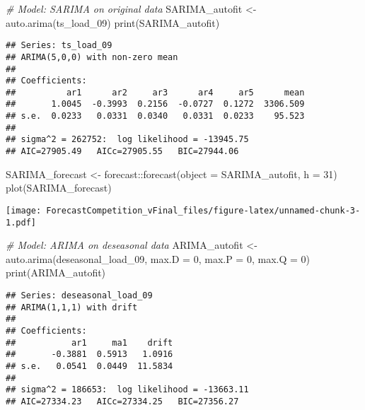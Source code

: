 \documentclass[
]{article}
\newenvironment{Shaded}{\begin{snugshade}}{\end{snugshade}}
\newcommand{\AttributeTok}[1]{\textcolor[rgb]{0.77,0.63,0.00}{#1}}
\newcommand{\CommentTok}[1]{\textcolor[rgb]{0.56,0.35,0.01}{\textit{#1}}}
\newcommand{\DecValTok}[1]{\textcolor[rgb]{0.00,0.00,0.81}{#1}}
\newcommand{\FunctionTok}[1]{\textcolor[rgb]{0.00,0.00,0.00}{#1}}
\newcommand{\NormalTok}[1]{#1}
\newcommand{\OtherTok}[1]{\textcolor[rgb]{0.56,0.35,0.01}{#1}}
\newcommand{\SpecialCharTok}[1]{\textcolor[rgb]{0.00,0.00,0.00}{#1}}
\begin{document}
\begin{Shaded}
\begin{Highlighting}[]
\CommentTok{\# Model:  SARIMA on original data}
\NormalTok{SARIMA\_autofit }\OtherTok{\textless{}{-}} \FunctionTok{auto.arima}\NormalTok{(ts\_load\_09)}
\FunctionTok{print}\NormalTok{(SARIMA\_autofit)}
\end{Highlighting}
\end{Shaded}

\begin{verbatim}
## Series: ts_load_09 
## ARIMA(5,0,0) with non-zero mean 
## 
## Coefficients:
##          ar1      ar2     ar3      ar4     ar5      mean
##       1.0045  -0.3993  0.2156  -0.0727  0.1272  3306.509
## s.e.  0.0233   0.0331  0.0340   0.0331  0.0233    95.523
## 
## sigma^2 = 262752:  log likelihood = -13945.75
## AIC=27905.49   AICc=27905.55   BIC=27944.06
\end{verbatim}

\begin{Shaded}
\begin{Highlighting}[]
\NormalTok{SARIMA\_forecast }\OtherTok{\textless{}{-}}\NormalTok{ forecast}\SpecialCharTok{::}\FunctionTok{forecast}\NormalTok{(}\AttributeTok{object =}\NormalTok{ SARIMA\_autofit, }\AttributeTok{h =} \DecValTok{31}\NormalTok{)}
\FunctionTok{plot}\NormalTok{(SARIMA\_forecast)}
\end{Highlighting}
\end{Shaded}

\texttt{[image: ForecastCompetition\_vFinal\_files/figure-latex/unnamed-chunk-3-1.pdf]}

\begin{Shaded}
\begin{Highlighting}[]
\CommentTok{\# Model:  ARIMA on deseasonal data}
\NormalTok{ARIMA\_autofit }\OtherTok{\textless{}{-}} \FunctionTok{auto.arima}\NormalTok{(deseasonal\_load\_09, }\AttributeTok{max.D =} \DecValTok{0}\NormalTok{, }\AttributeTok{max.P =} \DecValTok{0}\NormalTok{, }\AttributeTok{max.Q =} \DecValTok{0}\NormalTok{)}
\FunctionTok{print}\NormalTok{(ARIMA\_autofit)}
\end{Highlighting}
\end{Shaded}

\begin{verbatim}
## Series: deseasonal_load_09 
## ARIMA(1,1,1) with drift 
## 
## Coefficients:
##           ar1     ma1    drift
##       -0.3881  0.5913   1.0916
## s.e.   0.0541  0.0449  11.5834
## 
## sigma^2 = 186653:  log likelihood = -13663.11
## AIC=27334.23   AICc=27334.25   BIC=27356.27
\end{verbatim}
\end{document}
